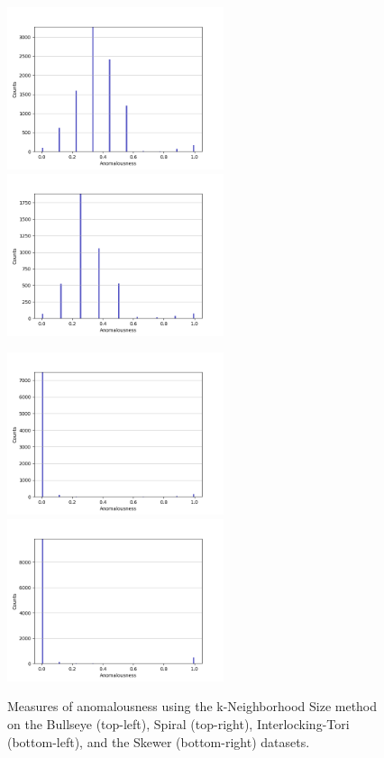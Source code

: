 \begin{figure}[!t]
\centering
\includegraphics[width=2.5in]{static/bullseye_k_neighborhood.png}\includegraphics[width=2.5in]{static/spiral_k_neighborhood.png}

\includegraphics[width=2.5in]{static/interlocking_tori_k_neighborhood.png}\includegraphics[width=2.5in]{static/skewer_k_neighborhood.png}

\caption{
Measures of anomalousness using the k-Neighborhood Size method on the Bullseye (top-left), Spiral (top-right), Interlocking-Tori (bottom-left), and the Skewer (bottom-right) datasets.
}

\label{results:histograms:k_neighborhood}
\end{figure}
